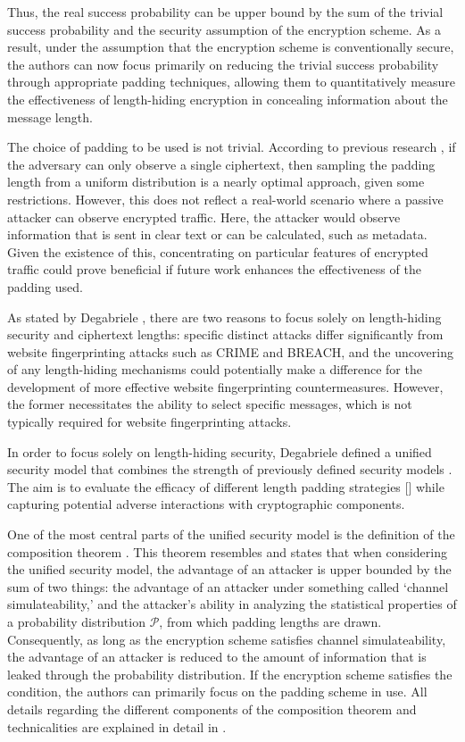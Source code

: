 Thus, the real success probability can be upper bound by the sum of the trivial success probability and the security assumption of the encryption scheme. As a result, under the assumption that the encryption scheme is conventionally secure, the authors can now focus primarily on reducing the trivial success probability through appropriate padding techniques, allowing them to quantitatively measure the effectiveness of length-hiding encryption in concealing information about the message length.

The choice of padding to be used is not trivial. According to previous research \cite{DBLP:conf/acns/TezcanV11}, if the adversary can only observe a single ciphertext, then sampling the padding length from a uniform distribution is a nearly optimal approach, given some restrictions. However, this does not reflect a real-world scenario where a passive attacker can observe encrypted traffic. Here, the attacker would observe information that is sent in clear text or can be calculated, such as metadata. Given the existence of this, concentrating on particular features of encrypted traffic could prove beneficial if future work enhances the effectiveness of the padding used.

As stated by Degabriele \cite{DBLP:conf/ccs/Degabriele21}, there are two reasons to focus solely on length-hiding security and ciphertext lengths: specific distinct attacks differ significantly from website fingerprinting attacks such as CRIME and BREACH, and the uncovering of any length-hiding mechanisms could potentially make a difference for the development of more effective website fingerprinting countermeasures. However, the former necessitates the ability to select specific messages, which is not typically required for website fingerprinting attacks. 

In order to focus solely on length-hiding security, Degabriele defined a unified security model that combines the strength of previously defined security models \cite{DBLP:conf/asiacrypt/PatersonRS11, DBLP:conf/acns/TezcanV11}. The aim is to evaluate the efficacy of different length padding strategies [] while capturing potential adverse interactions with cryptographic components.

One of the most central parts of the unified security model is the definition of the composition theorem \cite[Thm~3.3]{DBLP:conf/ccs/Degabriele21}. This theorem resembles  and states that when considering the unified security model, the advantage of an attacker is upper bounded by the sum of two things: the advantage of an attacker under something called `channel simulateability,' and the attacker's ability in analyzing the statistical properties of a probability distribution $\mathcal{P}$, from which padding lengths are drawn. Consequently, as long as the encryption scheme satisfies channel simulateability, the advantage of an attacker is reduced to the amount of information that is leaked through the probability distribution. If the encryption scheme satisfies the condition, the authors can primarily focus on the padding scheme in use. All details regarding the different components of the composition theorem and technicalities are explained in detail in \cite{DBLP:conf/ccs/Degabriele21}.

